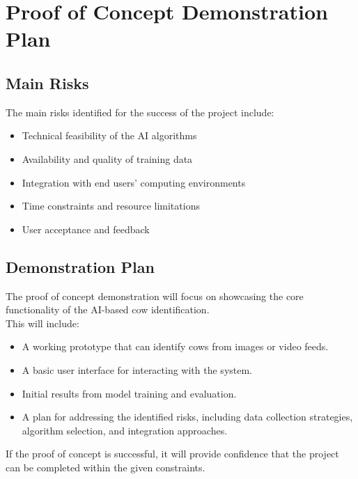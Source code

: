\documentclass{article}
\begin{document}

\section{Proof of Concept Demonstration Plan}

\subsection*{Main Risks}
The main risks identified for the success of the project include:
\begin{itemize}
  \item Technical feasibility of the AI algorithms
  \item Availability and quality of training data
  \item Integration with end users' computing environments
  \item Time constraints and resource limitations
  \item User acceptance and feedback
\end{itemize}

\subsection*{Demonstration Plan}
The proof of concept demonstration will focus on showcasing the core 
functionality of the AI-based cow identification. \\
This will include:
\begin{itemize}
  \item A working prototype that can identify cows from images or video feeds.
  \item A basic user interface for interacting with the system.
  \item Initial results from model training and evaluation.
  \item A plan for addressing the identified risks, including data collection strategies, 
  algorithm selection, and integration approaches.
\end{itemize}
If the proof of concept is successful, it will provide confidence that the project can be completed within the given constraints.
\end{document}
